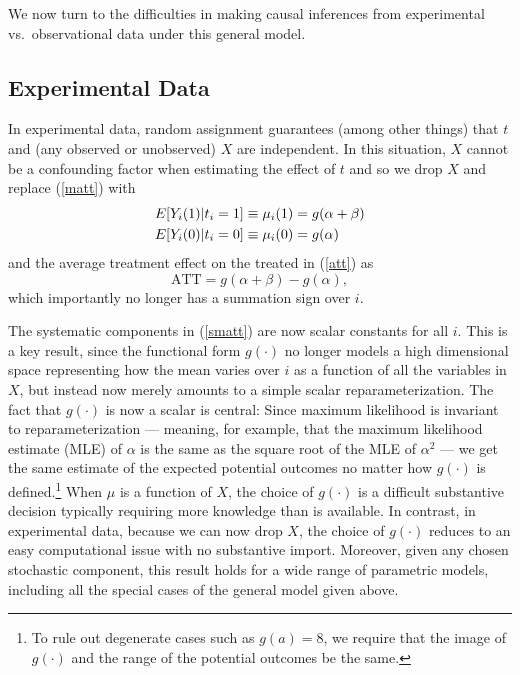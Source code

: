 \documentclass[11pt,titlepage]{article}
\begin{document}
We now turn to the difficulties in making causal inferences from
experimental vs.\ observational data under this general model.

\subsection{Experimental Data}\label{s:paraexp}

In experimental data, random assignment guarantees (among other
things) that $t$ and (any observed or unobserved) $X$ are independent.
In this situation, $X$ cannot be a confounding factor when estimating
the effect of $t$ and so we drop $X$ and replace  (\ref{matt}) with
\begin{align}
  \label{smatt}
  E[Y_i(1)|t_i=1] &\equiv \mu_i(1) = g(\alpha + \beta)\notag \\
  E[Y_i(0)|t_i=0] &\equiv \mu_i(0) = g(\alpha)
\end{align}
and the average treatment effect on the treated in (\ref{att}) as
\begin{equation}
  \label{satt}
  \text{ATT} = g(\alpha+\beta) - g(\alpha),
\end{equation}
which importantly no longer has a summation sign over $i$.

The systematic components in (\ref{smatt}) are now scalar constants
for all $i$.  This is a key result, since the functional form
$g(\cdot)$ no longer models a high dimensional space representing how
the mean varies over $i$ as a function of all the variables in $X$,
but instead now merely amounts to a simple scalar reparameterization.
The fact that $g(\cdot)$ is now a scalar is central: Since maximum
likelihood is invariant to reparameterization --- meaning, for
example, that the maximum likelihood estimate (MLE) of $\alpha$ is the
same as the square root of the MLE of $\alpha^2$
\citep[][p.75--76]{King89} --- we get the same estimate of the
expected potential outcomes no matter how $g(\cdot)$ is
defined.\footnote{To rule out degenerate cases such as $g(a)=8$, we
  require that the image of $g(\cdot)$ and the range of the potential
  outcomes be the same.}  When $\mu$ is a function of $X$, the
choice of $g(\cdot)$ is a difficult substantive decision typically
requiring more knowledge than is available.  In contrast, in
experimental data, because we can now drop $X$, the choice of
$g(\cdot)$ reduces to an easy computational issue with no substantive
import.  Moreover, given any chosen stochastic component, this result
holds for a wide range of parametric models, including all the special
cases of the general model given above.
\end{document}
